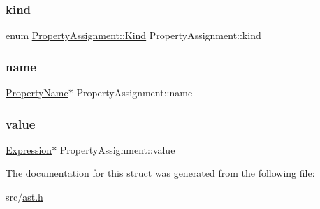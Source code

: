 \subsubsection{\texorpdfstring{kind}{kind}}
{\footnotesize\ttfamily enum \hyperlink{struct_property_assignment_a123a67b3e1b5d04a4a34b8d528e9fc96}{Property\+Assignment\+::\+Kind}  Property\+Assignment\+::kind}

\mbox{\label{struct_property_assignment_a5e0dc6f37850bd4ae74b811f6548e376}} 
\subsubsection{\texorpdfstring{name}{name}}
{\footnotesize\ttfamily \hyperlink{struct_property_name}{Property\+Name}$\ast$ Property\+Assignment\+::name}

\mbox{\label{struct_property_assignment_a4da33511737b9d611a62e4bca3d02324}} 
\subsubsection{\texorpdfstring{value}{value}}
{\footnotesize\ttfamily \hyperlink{struct_expression}{Expression}$\ast$ Property\+Assignment\+::value}



The documentation for this struct was generated from the following file\+:\begin{DoxyCompactItemize}
\item 
src/\hyperlink{ast_8h}{ast.\+h}\end{DoxyCompactItemize}
